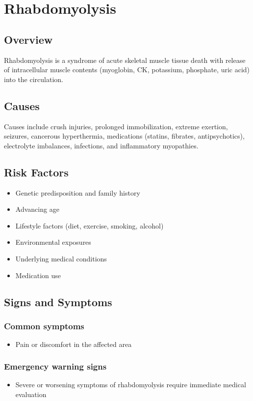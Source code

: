 \chapter{Rhabdomyolysis}
\label{sec:Rhabdomyolysis}

\section{Overview}
Rhabdomyolysis is a syndrome of acute skeletal muscle tissue death with release of intracellular muscle contents (myoglobin, CK, potassium, phosphate, uric acid) into the circulation.
\section{Causes}
Causes include crush injuries, prolonged immobilization, extreme exertion, seizures, cancerous hyperthermia, medications (statins, fibrates, antipsychotics), electrolyte imbalances, infections, and inflammatory myopathies.     
\section{Risk Factors}

\begin{itemize}[noitemsep]
  \item Genetic predisposition and family history
  \item Advancing age
  \item Lifestyle factors (diet, exercise, smoking, alcohol)
  \item Environmental exposures
  \item Underlying medical conditions
  \item Medication use
\end{itemize}
\section{Signs and Symptoms}

\subsection{Common symptoms}
\begin{itemize}[noitemsep]
  \item Pain or discomfort in the affected area
  \end{itemize}

\subsection{Emergency warning signs}
\begin{itemize}[noitemsep]
  \item Severe or worsening symptoms of rhabdomyolysis require immediate medical evaluation
\end{itemize}
